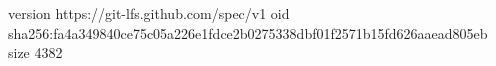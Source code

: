 version https://git-lfs.github.com/spec/v1
oid sha256:fa4a349840ce75c05a226e1fdce2b0275338dbf01f2571b15fd626aaead805eb
size 4382
